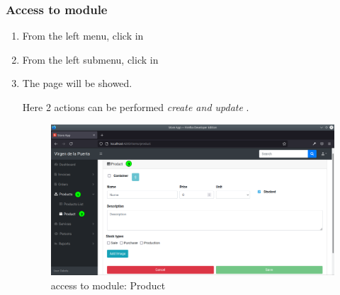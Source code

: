 \documentclass[a4paper,11pt]{refart}
\begin{document}
\subsubsection{Access to module}
\begin{enumerate}
	\item From the left menu, click in  
	\item From the left submenu, click in  
	\item The page will be showed.
	\medskip
	\begin{leftbar}
		Here 2 actions can be performed \emph{create and update} .
	\end{leftbar}
	\begin{figure}[H]\centering
		\includegraphics[width=\textwidth]{images/product_form-access.png}
		\caption{access to module: Product}
		\label{fig:product_form-access.png}
	\end{figure}
\end{enumerate}
\end{document}
